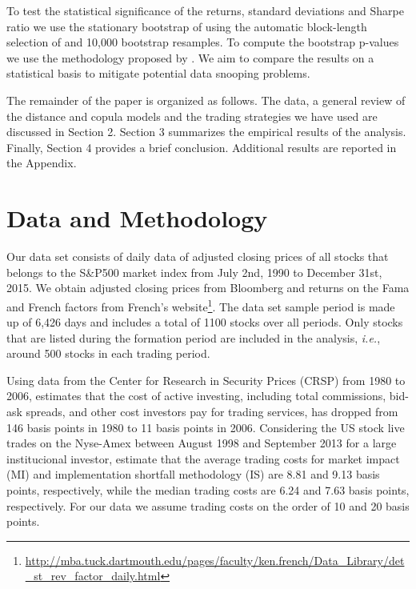 \documentclass[a4paper,12pt]{report}
\begin{document}
\begin{refsection}
	To test the statistical significance of the returns, standard deviations and Sharpe ratio we use the stationary bootstrap of \citet*{pr94} using the automatic block-length selection of \citet*{pw04} and 10,000 bootstrap resamples. To compute the bootstrap p-values we use the methodology proposed by \citet*{lw08}. We aim to compare the results on a statistical basis to mitigate potential data snooping problems.
	
	The remainder of the paper is organized as follows. The data, a general review of the distance and copula models and the trading strategies we have used are discussed in Section 2. Section 3 summarizes the empirical results of the analysis. Finally, Section 4 provides a brief conclusion. Additional results are reported in the Appendix.
	
	\section{Data and Methodology}
	
Our data set consists of daily data of adjusted closing prices of all stocks that belongs to the S\&P500 market index from July 2nd, 1990 to December 31st, 2015. We obtain adjusted closing prices from Bloomberg and returns on the Fama and French factors from French's website\footnote{\url{http://mba.tuck.dartmouth.edu/pages/faculty/ken.french/Data_Library/det_st_rev_factor_daily.html}}. The data set sample period is made up of 6,426 days and includes a total of 1100 stocks over all periods. Only stocks that are listed during the formation period are included in the analysis, \emph{i.e.}, around 500 stocks in each trading period.


Using data from the Center for Research in Security Prices (CRSP) from 1980 to 2006, \citet*{french2008} estimates that the cost of active investing, including total commissions, bid-ask spreads, and other cost investors pay for trading services, has dropped from 146 basis points in 1980 to 11 basis points in 2006. Considering the US stock live trades on the Nyse-Amex between August 1998 and September 2013 for a large institucional investor, \citet*{fim15} estimate that the average trading costs for market impact (MI) and implementation shortfall methodology (IS) are 8.81 and 9.13 basis points, respectively, while the median trading costs are 6.24 and 7.63 basis points, respectively. For our data we assume trading costs on the order of 10 and 20 basis points.
	
	\vspace{0.6cm}
	

\end{refsection}
\end{document}
